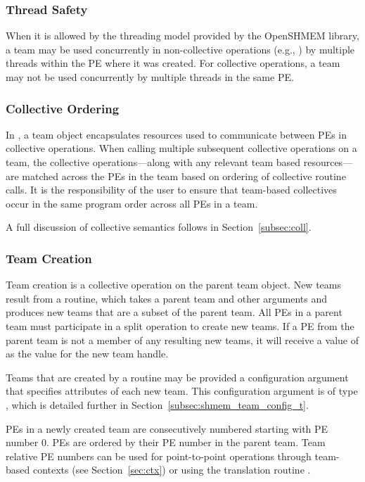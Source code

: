 \subsubsection*{Thread Safety}

When it is allowed by the threading model provided by the OpenSHMEM
library, a team may be used concurrently in non-collective operations
(e.g., ) by multiple threads within the
\ac{PE} where it was created.
For collective operations, a team may not be used concurrently by
multiple threads in the same \ac{PE}.

\subsubsection*{Collective Ordering}

In \openshmem, a team object encapsulates resources used to communicate
between \acp{PE} in collective operations. When calling multiple subsequent
collective operations on a team, the collective operations---along with any
relevant team based resources---are matched across the \acp{PE} in the team
based on ordering of collective routine calls. It is the responsibility
of the user to ensure that team-based collectives occur in the same program order
across all \acp{PE} in a team.

A full discussion of collective semantics follows in Section~\ref{subsec:coll}.

\subsubsection*{Team Creation}

Team creation is a collective operation on the parent team object. New teams
result from a  routine, which takes a parent team
and other arguments and produces new teams that are a subset of the parent
team. All \acp{PE} in a parent team must participate in a split operation
to create new teams. If a \ac{PE} from the parent team is not a member of any
resulting new teams, it will receive a value of 
as the value for the new team handle.

Teams that are created by a  routine may be
provided a configuration argument that specifies attributes of each new team.
This configuration argument is of type , which
is detailed further in Section~\ref{subsec:shmem_team_config_t}.

\acp{PE} in a newly created team are consecutively numbered starting with
\ac{PE} number 0. \acp{PE} are ordered by their \ac{PE} number in
the parent team. Team relative \ac{PE}
numbers can be used for point-to-point operations through team-based
contexts (see Section~\ref{sec:ctx}) or using the translation routine
.

